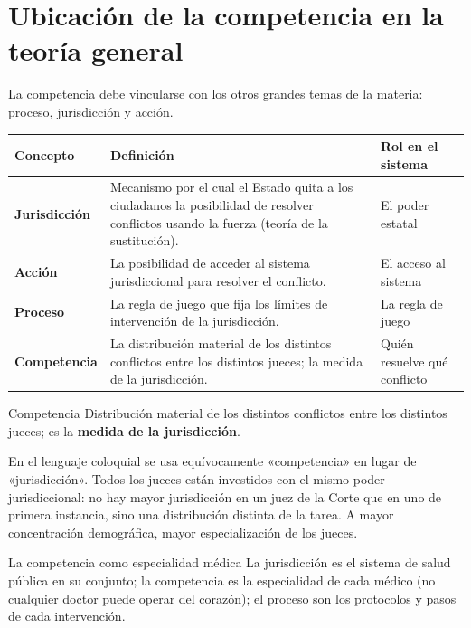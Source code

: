\documentclass[12pt,oneside]{book}
\renewcommand{\arraystretch}{1.15}
\begin{document}
\section{Ubicación de la competencia en la teoría general}

La competencia debe vincularse con los otros grandes temas de la materia: proceso, jurisdicción y acción.

\begin{table}[H]
\centering
\renewcommand{\arraystretch}{1.3}
\begin{tabularx}{\textwidth}{>{\RaggedRight\arraybackslash}p{}>{\RaggedRight\arraybackslash}X>{\RaggedRight\arraybackslash}p{}}
\toprule
\textbf{Concepto} & \textbf{Definición} & \textbf{Rol en el sistema} \\
\midrule
\textbf{Jurisdicción} & Mecanismo por el cual el Estado quita a los ciudadanos la posibilidad de resolver conflictos usando la fuerza (teoría de la sustitución). & El poder estatal \\
\addlinespace
\textbf{Acción} & La posibilidad de acceder al sistema jurisdiccional para resolver el conflicto. & El acceso al sistema \\
\addlinespace
\textbf{Proceso} & La regla de juego que fija los límites de intervención de la jurisdicción. & La regla de juego \\
\addlinespace
\textbf{Competencia} & La distribución material de los distintos conflictos entre los distintos jueces; la medida de la jurisdicción. & Quién resuelve qué conflicto \\
\bottomrule
\end{tabularx}
\end{table}

\begin{definicion}{Competencia}
Distribución material de los distintos conflictos entre los distintos jueces; es la \textbf{medida de la jurisdicción}.
\end{definicion}

En el lenguaje coloquial se usa equívocamente «competencia» en lugar de «jurisdicción». Todos los jueces están investidos con el mismo poder jurisdiccional: no hay mayor jurisdicción en un juez de la Corte que en uno de primera instancia, sino una distribución distinta de la tarea. A mayor concentración demográfica, mayor especialización de los jueces.

\begin{ejemplo}{La competencia como especialidad médica}
La jurisdicción es el sistema de salud pública en su conjunto; la competencia es la especialidad de cada médico (no cualquier doctor puede operar del corazón); el proceso son los protocolos y pasos de cada intervención.
\end{ejemplo}
\end{document}
